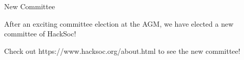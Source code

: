 \documentclass[12pt, landscape]{article}
\begin{document}
\begin{minipage}[t][17cm][t]{\textwidth}
\begin{multicols}{2}

 
\begin{minipage}{0.45\textwidth}{\fontsize{30}{40}\selectfont New Committee
 }\\\begin{addmargin}[1em]{0em}{\fontsize{16}{20}\selectfont After an exciting committee election at the AGM, we have elected a new committee of HackSoc!
 \par}{\fontsize{16}{20}\selectfont Check out https://www.hacksoc.org/about.html to see the new committee!
 \par}\end{addmargin}\end{minipage}\\

\end{multicols}
\end{minipage}

\noindent\hdashrule[0cm]{39.5cm}{1pt}{2pt}
\end{document}
